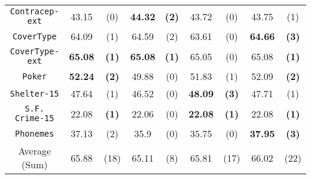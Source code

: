 \begin{table}
\begin{tabular}{c|cc|cc|cc|cc}
{\tt Contracep-ext} &  43.15       & (0)          &  {\bf 44.32} & {\bf (2)}    &  43.72       & (0)              & 43.75      & (1)          \\
{\tt CoverType}     &  64.09       & (1)          &  64.59       & (2)          &  63.61       & (0)              &{\bf 64.66} & {\bf (3)}    \\
{\tt CoverType-ext} &  {\bf 65.08} & {\bf (1)}    &  {\bf 65.08} & {\bf (1)}    &  65.05       & (0)              & 65.08      & {\bf (1)}    \\
{\tt Poker}         &  {\bf 52.24} & {\bf (2)}    &  49.88       & (0)          &  51.83       & (1)              & 52.09      & {\bf (2)}    \\ 
{\tt Shelter-15}    &  47.64       & (1)          &  46.52       & (0)          & {\bf 48.09}  & {\bf (3)}        & 47.71      & (1)          \\ 
{\tt S.F. Crime-15} &  22.08       & {\bf (1)}    &  22.06       & (0)          & {\bf 22.08}  & {\bf (1)}        & 22.08      & {\bf (1)}    \\   
{\tt Phonemes}      &  37.13       & (2)          &  35.9        & (0)          & 35.75        & (0)              &{\bf 37.95} & {\bf (3)}    \\
\hline
Average (Sum)       &  65.88       & (18)         &  65.11       & (8)          & 65.81        & (17)             &  66.02     & (22)
\end{tabular}
\normalsize
\label{tab:CrossVal-a}
\end{table}

